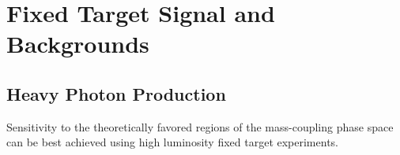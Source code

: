 
\chapter{Fixed Target Signal and Backgrounds}

\section{Heavy Photon Production}

Sensitivity to the theoretically favored regions of the mass-coupling phase
space can be best achieved using high luminosity fixed target experiments.
